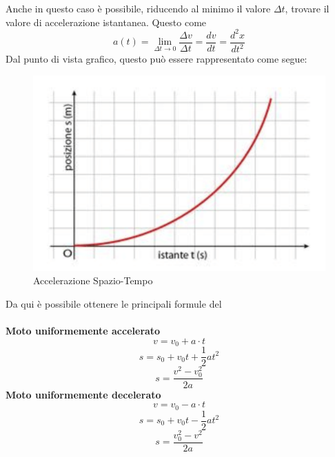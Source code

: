 \documentclass{article}
\begin{document}
\noindent Anche in questo caso è possibile, riducendo al minimo il valore \(\Delta t\), trovare il valore di accelerazione istantanea.
Questo come
\[
a(t)= \lim_{\Delta t\to 0} \frac{\Delta v}{\Delta t} = \frac{dv}{dt} = \frac{d^2x}{dt^2}
\]
Dal punto di vista grafico, questo può essere rappresentato come segue:
\begin{figure}[ht]
    \centering
    \includegraphics[width=0.75\linewidth]{Immagini/Accelerazione Spazio-Tempo.png}
    \caption{Accelerazione Spazio-Tempo}
\end{figure}
\newpage
\noindent Da qui è possibile ottenere le principali formule del \\
\\
\textbf{Moto uniformemente accelerato}
\[
v = v_0 + a \cdot t
\]
\[
s = s_0 + v_0t + \frac{1}{2}at^2
\]
\[
s = \frac{v^2 - v^2_0}{2a}
\]
\textbf{Moto uniformemente decelerato}
\[
v = v_0 - a \cdot t
\]
\[
s = s_0 +v_0t - \frac{1}{2}at^2
\]
\[
s = \frac{v^2_0 - v^2}{2a}
\]
\end{document}

